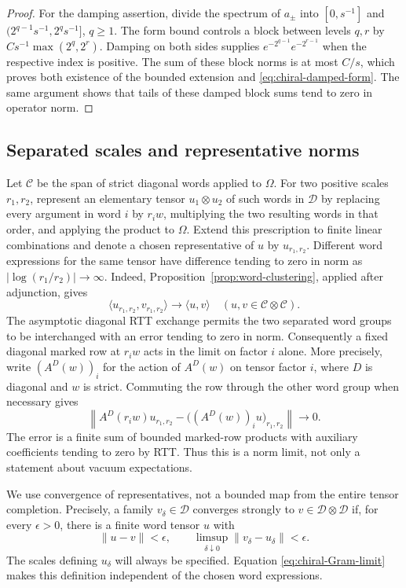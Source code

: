 \begin{proof}
For the damping assertion, divide the spectrum of $a_\pm$ into
$[0,s^{-1}]$ and $(2^{q-1}s^{-1},2^qs^{-1}]$, $q\ge1$.
The form bound controls a block between levels $q,r$ by
$Cs^{-1}\max(2^q,2^r)$. Damping on both sides supplies
$e^{-2^{q-1}}e^{-2^{r-1}}$ when the respective index is positive.
The sum of these block norms is at most $C/s$, which proves both
existence of the bounded extension and \eqref{eq:chiral-damped-form}.
The same argument shows that tails of these damped block sums tend to
zero in operator norm.
\end{proof}

\subsection{Separated scales and representative norms}

Let $\mathcal C$ be the span of strict diagonal words applied to $\Omega$.
For two positive scales $r_1,r_2$, represent an elementary tensor
$u_1\otimes u_2$ of such words in $\mathcal D$ by replacing every argument
in word $i$ by $r_iw$, multiplying the two resulting words in that order,
and applying the product to $\Omega$. Extend this prescription to finite
linear combinations and denote a chosen representative of $u$ by
$u_{r_1,r_2}$. Different word expressions for the same tensor have
difference tending to zero in norm as $|\log(r_1/r_2)|\to\infty$.
Indeed, Proposition~\ref{prop:word-clustering}, applied after adjunction,
gives
\begin{equation}\label{eq:chiral-Gram-limit}
       \langle u_{r_1,r_2},v_{r_1,r_2}\rangle
                          \longrightarrow\langle u,v\rangle
                  \quad(u,v\in\mathcal C\otimes\mathcal C).
\end{equation}
The asymptotic diagonal RTT exchange permits the two separated word
groups to be interchanged with an error tending to zero in norm.
Consequently a fixed diagonal marked row at $r_iw$ acts in the limit
on factor $i$ alone. More precisely, write $(A^D(w))_i$ for the action
of $A^D(w)$ on tensor factor $i$, where $D$ is diagonal and $w$ is
strict. Commuting the row through the other word group when necessary gives
\[
 \left\|A^D(r_iw)u_{r_1,r_2}
       -\bigl((A^D(w))_iu\bigr)_{r_1,r_2}\right\|\longrightarrow0.
\]
The error is a finite sum of bounded marked-row products with auxiliary
coefficients tending to zero by RTT. Thus this is a norm limit, not
only a statement about vacuum expectations.

We use convergence of representatives, not a bounded map from the entire
tensor completion. Precisely, a family $v_\delta\in\mathcal D$ converges
strongly to $v\in\mathcal D\otimes\mathcal D$ if, for every $\epsilon>0$,
there is a finite word tensor $u$ with
\[
 \|u-v\|<\epsilon,\qquad
 \limsup_{\delta\downarrow0}\|v_\delta-u_\delta\|<\epsilon.
\]
The scales defining $u_\delta$ will always be specified. Equation
\eqref{eq:chiral-Gram-limit} makes this definition independent of the
chosen word expressions.

